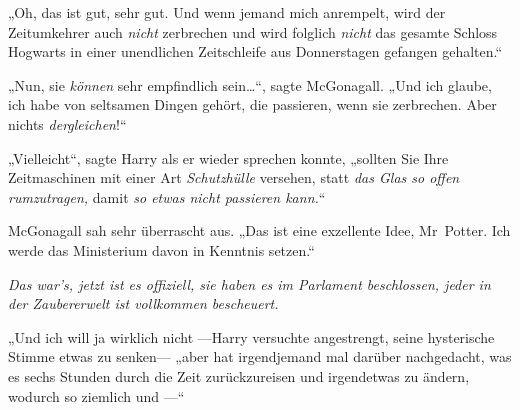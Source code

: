„Oh, das ist gut, sehr gut. Und wenn jemand mich anrempelt, wird der Zeitumkehrer auch \emph{nicht} zerbrechen und wird folglich \emph{nicht} das gesamte Schloss Hogwarts in einer unendlichen Zeitschleife aus Donnerstagen gefangen gehalten.“

„Nun, sie \emph{können} sehr empfindlich sein…“, sagte McGonagall. „Und ich glaube, ich habe von seltsamen Dingen gehört, die passieren, wenn sie zerbrechen. Aber nichts \emph{dergleichen}!“

„Vielleicht“, sagte Harry als er wieder sprechen konnte, „sollten Sie Ihre Zeitmaschinen mit einer Art \emph{Schutzhülle} versehen, statt \emph{das Glas so offen rumzutragen,} damit \emph{so etwas nicht passieren kann.}“

McGonagall sah sehr überrascht aus. „Das ist eine exzellente Idee, Mr~Potter. Ich werde das Ministerium davon in Kenntnis setzen.“

\emph{Das war’s, jetzt ist es offiziell, sie haben es im Parlament beschlossen, jeder in der Zaubererwelt ist vollkommen bescheuert.}

„Und ich will ja wirklich nicht —Harry versuchte angestrengt, seine hysterische Stimme etwas zu senken— „aber hat irgendjemand mal darüber nachgedacht, was es  sechs Stunden durch die Zeit zurückzureisen und irgendetwas zu ändern, wodurch so ziemlich  und —“

